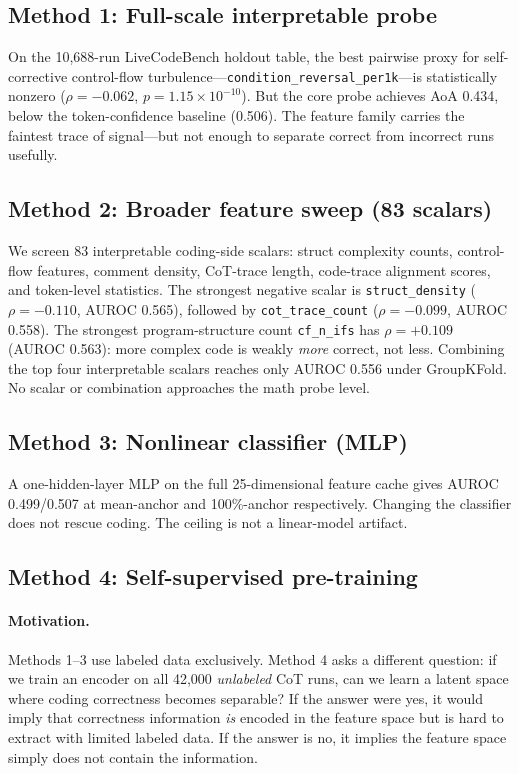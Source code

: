 \documentclass[10pt,twocolumn]{article}
\begin{document}
\subsection{Method 1: Full-scale interpretable probe}

On the 10,688-run LiveCodeBench holdout table, the best pairwise proxy for self-corrective control-flow turbulence---\texttt{condition\_reversal\_per1k}---is statistically nonzero ($\rho = -0.062$, $p = 1.15\times 10^{-10}$). But the core probe achieves AoA 0.434, below the token-confidence baseline (0.506). The feature family carries the faintest trace of signal---but not enough to separate correct from incorrect runs usefully.

\subsection{Method 2: Broader feature sweep (83 scalars)}

We screen 83 interpretable coding-side scalars: struct complexity counts, control-flow features, comment density, CoT-trace length, code-trace alignment scores, and token-level statistics. The strongest negative scalar is \texttt{struct\_density} ($\rho = -0.110$, AUROC 0.565), followed by \texttt{cot\_trace\_count} ($\rho = -0.099$, AUROC 0.558). The strongest program-structure count \texttt{cf\_n\_ifs} has $\rho = +0.109$ (AUROC 0.563): more complex code is weakly \emph{more} correct, not less. Combining the top four interpretable scalars reaches only AUROC 0.556 under GroupKFold. No scalar or combination approaches the math probe level.

\subsection{Method 3: Nonlinear classifier (MLP)}

A one-hidden-layer MLP on the full 25-dimensional feature cache gives AUROC 0.499/0.507 at mean-anchor and 100\%-anchor respectively. Changing the classifier does not rescue coding. The ceiling is not a linear-model artifact.

\subsection{Method 4: Self-supervised pre-training}

\label{sec:ssl}
\paragraph{Motivation.} Methods 1--3 use labeled data exclusively. Method 4 asks a different question: if we train an encoder on all 42,000 \emph{unlabeled} CoT runs, can we learn a latent space where coding correctness becomes separable? If the answer were yes, it would imply that correctness information \emph{is} encoded in the feature space but is hard to extract with limited labeled data. If the answer is no, it implies the feature space simply does not contain the information.
\end{document}
